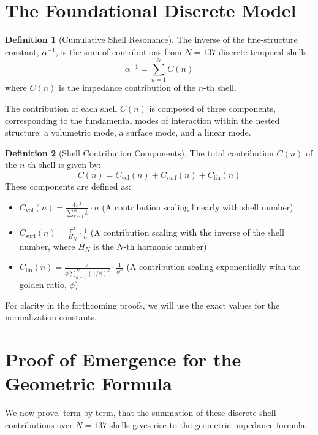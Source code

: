\documentclass[12pt,a4paper]{article}
\theoremstyle{plain}
\theoremstyle{definition}
\newtheorem{definition}{Definition}[section]
\theoremstyle{remark}
\begin{document}
\section{The Foundational Discrete Model}

\begin{definition}[Cumulative Shell Resonance]
The inverse of the fine-structure constant, $\alpha^{-1}$, is the sum of contributions from $N=137$ discrete temporal shells.
\begin{equation}
\alpha^{-1} = \sum_{n=1}^{N} C(n)
\end{equation}
where $C(n)$ is the impedance contribution of the $n$-th shell.
\end{definition}

The contribution of each shell $C(n)$ is composed of three components, corresponding to the fundamental modes of interaction within the nested structure: a volumetric mode, a surface mode, and a linear mode.

\begin{definition}[Shell Contribution Components]
The total contribution $C(n)$ of the $n$-th shell is given by:
\begin{equation}
C(n) = C_{\text{vol}}(n) + C_{\text{surf}}(n) + C_{\text{lin}}(n)
\end{equation}
These components are defined as:
\begin{itemize}
    \item $C_{\text{vol}}(n) = \frac{4\pi^3}{\sum_{k=1}^{N} k} \cdot n$ (A contribution scaling linearly with shell number)
    \item $C_{\text{surf}}(n) = \frac{\pi^2}{H_N} \cdot \frac{1}{n}$ (A contribution scaling with the inverse of the shell number, where $H_N$ is the $N$-th harmonic number)
    \item $C_{\text{lin}}(n) = \frac{\pi}{\phi \sum_{k=1}^{N} (1/\phi)^k} \cdot \frac{1}{\phi^n}$ (A contribution scaling exponentially with the golden ratio, $\phi$)
\end{itemize}
\end{definition}
For clarity in the forthcoming proofs, we will use the exact values for the normalization constants.

\section{Proof of Emergence for the Geometric Formula}

We now prove, term by term, that the summation of these discrete shell contributions over $N=137$ shells gives rise to the geometric impedance formula.
\end{document}
